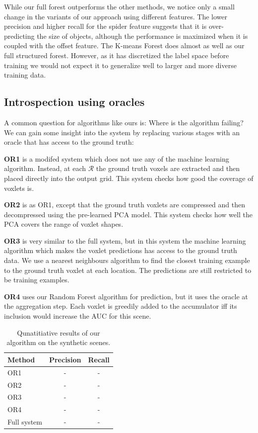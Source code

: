 \documentclass[10pt,twocolumn,letterpaper]{article}
\begin{document}
While our full forest outperforms the other methods, we notice only a small change in the variants of our approach using different features.
The lower precision and higher recall for the spider feature suggests that it is over-predicting the size of objects, although the performance is maximized when it is coupled with the offset feature.
The K-means Forest does almost as well as our full structured forest.
However, as it has discretized the label space before training we would not expect it to generalize well to larger and more diverse training data.

\subsection{Introspection using oracles}
\label{sec:oracles}

A common question for algorithms like ours is: Where is the algorithm failing? We can gain some insight into the system by replacing various stages with an oracle that has access to the ground truth:

\textbf{OR1} is a modifed system which does not use any of the machine learning algorithm. Instead, at each $\mathcal{R}$ the ground truth voxels are extracted and then placed directly into the output grid. This system checks how good the coverage of voxlets is.

\textbf{OR2} is as OR1, except that the ground truth voxlets are compressed and then decompressed using the pre-learned PCA model. This system checks how well the PCA covers the range of voxlet shapes.

\textbf{OR3} is very similar to the full system, but in this system the machine learning algorithm which makes the voxlet predictions has access to the ground truth data. We use a nearest neighbours algorithm to find the closest training example to the ground truth voxlet at each location. The predictions are still restricted to be training examples.

\textbf{OR4} uses our Random Forest algorithm for prediction, but it uses the oracle at the aggregation step. Each voxlet is greedily added to the accumulator iff its inclusion would increase the AUC for this scene.


\begin{table}
  \centering
  \begin{tabular}{|p{4.8cm}|c|c|}
  \hline
  \textbf{Method}  &   \textbf{Precision} & \textbf{Recall} \\
  \hline
  OR1 & - & - \\
  OR2 & - & - \\
  OR3 & - & - \\
  OR4 & - & - \\
  Full system & - & - \\
  \hline
  \end{tabular}
  \vspace{5pt}
  \caption{Qunatitiative results of our algorithm on the synthetic scenes.}
    \label{tab:oracle_results}
\end{table}
\end{document}
